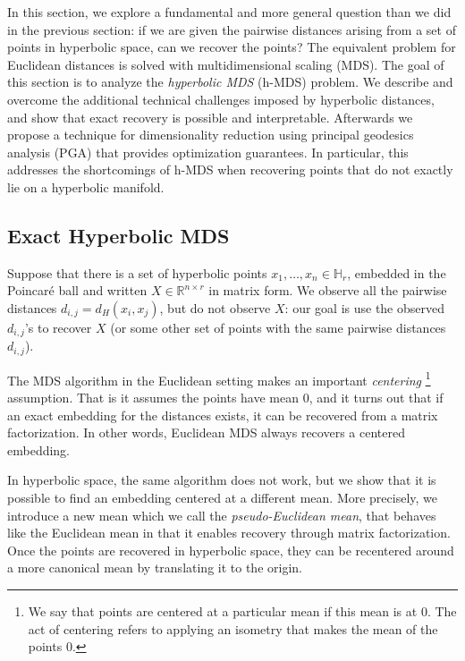 In this section, we explore a fundamental and more general question than we did in the previous section: if we are given the pairwise distances arising from a set of points in hyperbolic space, can we recover the points? The equivalent problem for Euclidean distances is solved with multidimensional scaling (MDS). The goal of this section is to analyze the \emph{hyperbolic MDS} (h-MDS) problem. We describe and overcome the additional technical challenges imposed by hyperbolic distances, and show that exact recovery is possible and interpretable.
Afterwards we propose a technique for dimensionality reduction using principal geodesics analysis (PGA) that provides optimization guarantees.
In particular, this addresses the shortcomings of h-MDS when recovering points that do not exactly lie on a hyperbolic manifold.

\subsection{Exact Hyperbolic MDS}
\label{sec:exactmds}


Suppose that there is a set of
hyperbolic points $x_1,\dots, x_n \in \mathbb{H}_r$, embedded in the Poincar{\'e} ball and written $X \in
\mathbb{R}^{n \times r}$ in matrix form.
We observe all the pairwise distances $d_{i,j} = d_H(x_i, x_j)$, but do not observe $X$:
our goal is use the observed $d_{i,j}$'s to recover $X$ (or some other set of points with the same pairwise distances $d_{i,j}$).

The MDS algorithm in the Euclidean setting makes an important
\emph{centering}%
\footnote{We say that points are centered at a particular mean
  if this mean is at $0$. The act of centering refers to applying an isometry
  that makes the mean of the points $0$.}
assumption.
That is it assumes the points have mean $0$, and it turns out that if an exact
embedding for the distances exists, it can be recovered from a matrix factorization.
In other words, Euclidean MDS always recovers a centered embedding.

In hyperbolic space, the same algorithm does not work, but we show that it is possible to find an embedding centered at a different mean. 
More precisely, we introduce a new mean which we call the \emph{pseudo-Euclidean mean}, that behaves like the Euclidean mean in that it enables recovery through matrix factorization.
Once the points are recovered in hyperbolic space, they can be recentered around a more canonical mean by translating it to the origin.

